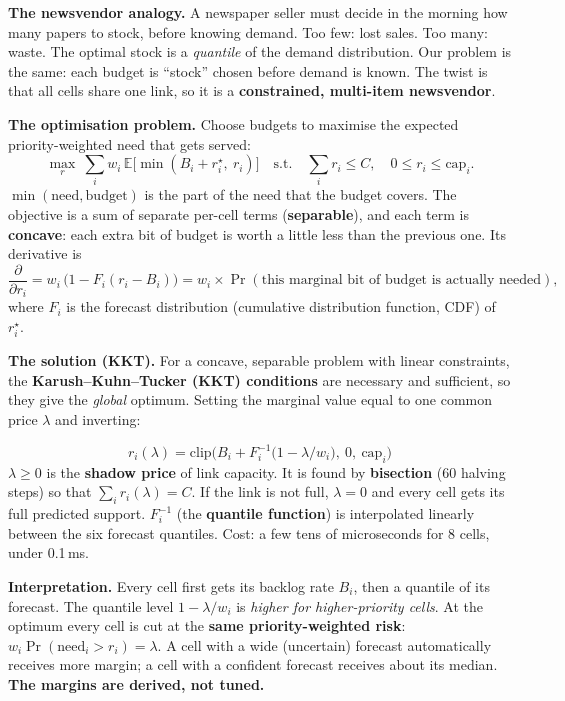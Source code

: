 \documentclass[11pt,a4paper]{article}
\newcommand{\rstar}{r^\star}
\begin{document}
\textbf{The newsvendor analogy.} A newspaper seller must decide in the morning how many papers to stock, before knowing demand. Too few: lost sales. Too many: waste. The optimal stock is a \emph{quantile} of the demand distribution. Our problem is the same: each budget is ``stock'' chosen before demand is known. The twist is that all cells share one link, so it is a \textbf{constrained, multi-item newsvendor}.

\textbf{The optimisation problem.} Choose budgets to maximise the expected priority-weighted need that gets served:
\[
  \max_{r}\ \sum_i w_i\,\mathbb{E}\big[\min(B_i + \rstar_i,\ r_i)\big]
  \quad\text{s.t.}\quad \sum_i r_i \le C,\quad 0\le r_i\le \mathrm{cap}_i .
\]
$\min(\text{need}, \text{budget})$ is the part of the need that the budget covers. The objective is a sum of separate per-cell terms (\textbf{separable}), and each term is \textbf{concave}: each extra bit of budget is worth a little less than the previous one. Its derivative is
\[
  \frac{\partial}{\partial r_i} = w_i\,\big(1 - F_i(r_i - B_i)\big)
  = w_i \times \Pr(\text{this marginal bit of budget is actually needed}),
\]
where $F_i$ is the forecast distribution (cumulative distribution function, CDF) of $\rstar_i$.

\textbf{The solution (KKT).} For a concave, separable problem with linear constraints, the \textbf{Karush--Kuhn--Tucker (KKT) conditions} are necessary and sufficient, so they give the \emph{global} optimum. Setting the marginal value equal to one common price $\lambda$ and inverting:
\begin{idea}
\[
  r_i(\lambda) = \mathrm{clip}\Big(B_i + F_i^{-1}\big(1 - \lambda/w_i\big),\ 0,\ \mathrm{cap}_i\Big)
\]
$\lambda \ge 0$ is the \textbf{shadow price} of link capacity. It is found by \textbf{bisection} (60 halving steps) so that $\sum_i r_i(\lambda) = C$. If the link is not full, $\lambda = 0$ and every cell gets its full predicted support. $F_i^{-1}$ (the \textbf{quantile function}) is interpolated linearly between the six forecast quantiles. Cost: a few tens of microseconds for 8 cells, under 0.1\,ms.
\end{idea}

\textbf{Interpretation.} Every cell first gets its backlog rate $B_i$, then a quantile of its forecast. The quantile level $1 - \lambda/w_i$ is \emph{higher for higher-priority cells}. At the optimum every cell is cut at the \textbf{same priority-weighted risk}: $w_i\Pr(\text{need}_i > r_i) = \lambda$. A cell with a wide (uncertain) forecast automatically receives more margin; a cell with a confident forecast receives about its median. \textbf{The margins are derived, not tuned.}
\end{document}
